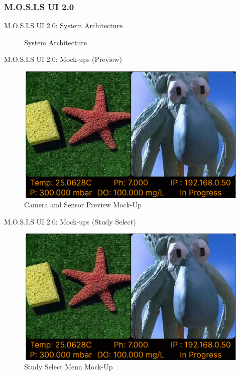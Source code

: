 \documentclass[17pt, aspectratio=169]{beamer}
\begin{document}
\subsubsection*{M.O.S.I.S UI 2.0}
\begin{frame}{M.O.S.I.S UI 2.0: System Architecture}
	\begin{figure}
		\caption{System Architecture}
	\end{figure}
\end{frame}
\begin{frame}{M.O.S.I.S UI 2.0: Mock-ups (Preview)}
	\begin{figure}
		\includegraphics[page=1,height=0.65\textheight]{../../Progress_Report_Document/Appendix/Design_Documentation/User_Interface/Figures/M.O.S.I.S_UI_Design.pdf}
		\caption{Camera and Sensor Preview Mock-Up}
	\end{figure}
\end{frame}
\begin{frame}{M.O.S.I.S UI 2.0: Mock-ups (Study Select)}
	\begin{figure}
		\includegraphics[page=2,height=0.65\textheight]{../../Progress_Report_Document/Appendix/Design_Documentation/User_Interface/Figures/M.O.S.I.S_UI_Design.pdf}
		\caption{Study Select Menu Mock-Up}
	\end{figure}
\end{frame}
\end{document}
